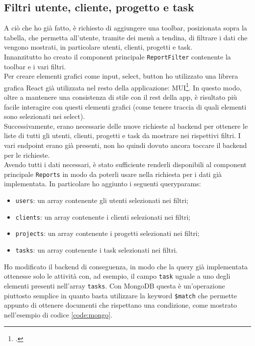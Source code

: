 \subsection{Filtri utente, cliente, progetto e task}
\noindent A ciò che ho già fatto, è richiesto di aggiungere una toolbar, posizionata sopra la tabella, che permetta all'utente, tramite dei menù a tendina, di filtrare i dati che vengono mostrati, in particolare utenti, clienti, progetti e task. \\
Innanzitutto ho creato il component principale \texttt{ReportFilter} contenente la toolbar e i vari filtri. \\
Per creare elementi grafici come input, select, button ho utilizzato una librera grafica React già utilizzata nel resto della applicazione: MUI\footcite{site:mui}. In questo modo, oltre a mantenere una consistenza di stile con il rest della app, è risultato più facile interagire con questi elementi grafici (come tenere traccia di quali elementi sono selezionati nei select).\\
Successivamente, erano necessarie delle nuove richieste al backend per ottenere le liste di tutti gli utenti, clienti, progetti e task da mostrare nei rispettivi filtri. I vari endpoint erano già presenti, non ho quindi dovuto ancora toccare il backend per le richieste.\\
Avendo tutti i dati necessari, è stato sufficiente renderli disponibili al component principale \texttt{Reports} in modo da poterli usare nella richiesta per i dati già implementata. In particolare ho aggiunto i seguenti queryparams:
\begin{itemize}
  \item \texttt{users}: un array contenente gli utenti selezionati nei filtri;
  \item \texttt{clients}: un array contenente i clienti selezionati nei filtri;
  \item \texttt{projects}: un array contenente i progetti selezionati nei filtri;
  \item \texttt{tasks}: un array contenente i task selezionati nei filtri.
\end{itemize}
Ho modificato il backend di conseguenza, in modo che la query già implementata ottenesse solo le attività con, ad esempio, il campo \texttt{task} uguale a uno degli elementi presenti nell'array \texttt{tasks}. Con MongoDB questa è un'operazione piuttosto semplice in quanto basta utilizzare la keyword \texttt{\$match} che permette appunto di ottenere documenti che rispettano una condizione, come mostrato nell'esempio di codice \ref{code:mongo}.

